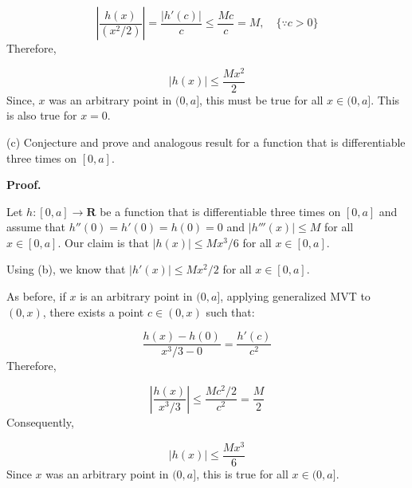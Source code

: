 \documentclass[10pt]{article}
\begin{document}
\begin{equation*}
\left| \frac{h( x)}{\left( x^{2} /2\right)}\right| =\frac{|h'( c) |}{c} \leq \frac{Mc}{c} =M,\quad \{\because c >0\}
\end{equation*}
Therefore,


\begin{equation*}
|h( x) |\leq \frac{Mx^{2}}{2}
\end{equation*}
Since, $\displaystyle x$ was an arbitrary point in $\displaystyle ( 0,a]$, this must be true for all $\displaystyle x\in ( 0,a]$. This is also true for $\displaystyle x=0$.



(c) Conjecture and prove and analogous result for a function that is differentiable three times on $\displaystyle [ 0,a]$.



\textbf{Proof.} 



Let $\displaystyle h:[ 0,a]\rightarrow \mathbf{R}$ be a function that is differentiable three times on $\displaystyle [ 0,a]$ and assume that $\displaystyle h''( 0) =h'( 0) =h( 0) =0$ and $\displaystyle | h'''( x)| \leq M$ for all $\displaystyle x\in [ 0,a]$. Our claim is that $\displaystyle |h( x) |\leq Mx^{3} /6$ for all $\displaystyle x\in [ 0,a]$. 



Using (b), we know that $\displaystyle |h'( x) |\leq Mx^{2} /2$ for all $\displaystyle x\in [ 0,a]$.



As before, if $\displaystyle x$ is an arbitrary point in $\displaystyle ( 0,a]$, applying generalized MVT to $\displaystyle ( 0,x)$, there exists a point $\displaystyle c\in ( 0,x)$ such that:




\begin{equation*}
\frac{h( x) -h( 0)}{x^{3} /3-0} =\frac{h'( c)}{c^{2}}
\end{equation*}
 Therefore,


\begin{equation*}
\left| \frac{h( x)}{x^{3} /3}\right| \leq \frac{Mc^{2} /2}{c^{2}} =\frac{M}{2}
\end{equation*}
Consequently,


\begin{equation*}
|h( x) |\leq \frac{Mx^{3}}{6}
\end{equation*}
Since $\displaystyle x$ was an arbitrary point in $\displaystyle ( 0,a]$, this is true for all $\displaystyle x\in ( 0,a]$.
\end{document}
